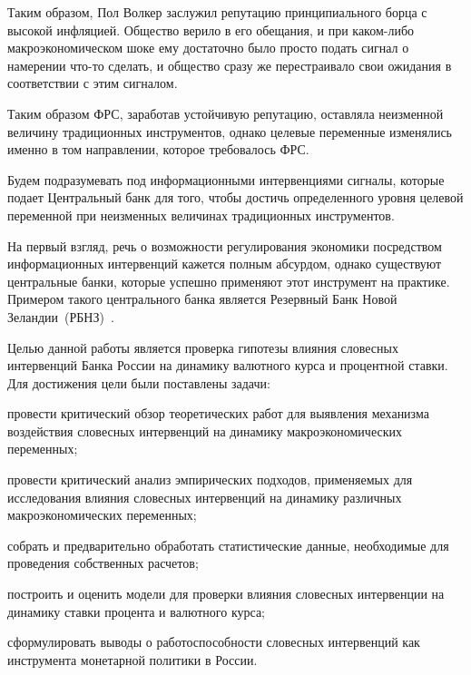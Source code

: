 \documentclass[14pt,a4paper, oneside]{extreport}
\newcounter{notes}
\renewenvironment{enumerate}%
{\begin{list}{\arabic{notes})} {\usecounter{notes}%
\setlength{\parsep}{0em}%
\setlength{\itemsep}{0em}%
\setlength{\topsep}{0.75ex}%
\setlength{\parskip}{0em}
}}%
{\end{list}}
\theoremstyle{plain}              %
\theoremstyle{definition}         %
\begin{document}
Таким образом, Пол Волкер заслужил репутацию принципиального борца с высокой инфляцией. Общество верило в его обещания, и при каком-либо макроэкономическом шоке ему достаточно было просто подать сигнал о намерении что-то сделать, и общество сразу же перестраивало свои ожидания в соответствии с этим сигналом.

Таким образом ФРС, заработав устойчивую репутацию, оставляла неизменной величину традиционных инструментов, однако целевые переменные изменялись именно в том направлении, которое требовалось ФРС.

Будем подразумевать под информационными интервенциями сигналы, которые подает Центральный банк для того, чтобы достичь определенного уровня целевой переменной при неизменных величинах традиционных инструментов.

На первый взгляд, речь о возможности регулирования экономики посредством информационных интервенций кажется полным абсурдом, однако существуют центральные банки, которые успешно применяют этот инструмент на практике. Примером такого центрального банка является Резервный Банк Новой Зеландии~(РБНЗ)~\cite{guthrie2000open}.

Целью данной работы является проверка гипотезы влияния словесных интервенций Банка России на динамику валютного курса и процентной ставки. Для достижения цели были поставлены задачи: 

\begin{enumerate}
\item провести критический обзор теоретических работ для выявления механизма воздействия словесных интервенций на динамику макроэкономических переменных;

\item провести критический анализ эмпирических подходов, применяемых для исследования влияния словесных интервенций на динамику различных макроэкономических переменных;

\item собрать и предварительно обработать статистические данные, необходимые для проведения собственных расчетов;

\item построить и оценить модели для проверки влияния словесных интервенции на динамику ставки процента и валютного курса;

\item сформулировать выводы о работоспособности словесных интервенций как инструмента монетарной политики в России.
\end{enumerate}
\end{document}
